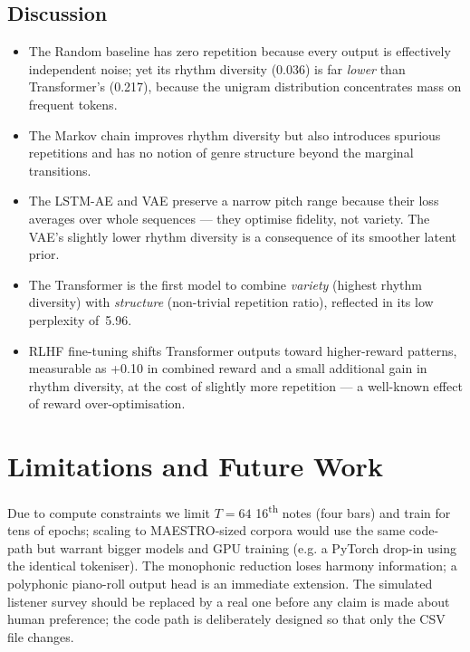 \documentclass[conference]{IEEEtran}
\begin{document}
\subsection{Discussion}
\begin{itemize}
  \item The Random baseline has zero repetition because every output is
        effectively independent noise; yet its rhythm diversity
        (0.036) is far \emph{lower} than Transformer's (0.217),
        because the unigram distribution concentrates mass on frequent
        tokens.
  \item The Markov chain improves rhythm diversity but also introduces
        spurious repetitions and has no notion of genre structure beyond
        the marginal transitions.
  \item The LSTM-AE and VAE preserve a narrow pitch range because their
        loss averages over whole sequences --- they optimise fidelity,
        not variety. The VAE's slightly lower rhythm diversity is a
        consequence of its smoother latent prior.
  \item The Transformer is the first model to combine \emph{variety}
        (highest rhythm diversity) with \emph{structure}
        (non-trivial repetition ratio), reflected in its low perplexity
        of~5.96.
  \item RLHF fine-tuning shifts Transformer outputs toward higher-reward
        patterns, measurable as +0.10 in combined reward and a small
        additional gain in rhythm diversity, at the cost of slightly
        more repetition --- a well-known effect of reward over-optimisation.
\end{itemize}

\section{Limitations and Future Work}

Due to compute constraints we limit $T\!=\!64$ 16\textsuperscript{th} notes
(four bars) and train for tens of epochs; scaling to MAESTRO-sized
corpora would use the same code-path but warrant bigger models and GPU
training (e.g. a PyTorch drop-in using the identical tokeniser).
The monophonic reduction loses harmony information; a polyphonic
piano-roll output head is an immediate extension. The simulated listener
survey should be replaced by a real one before any claim is made about
human preference; the code path is deliberately designed so that only the
CSV file changes.
\end{document}
